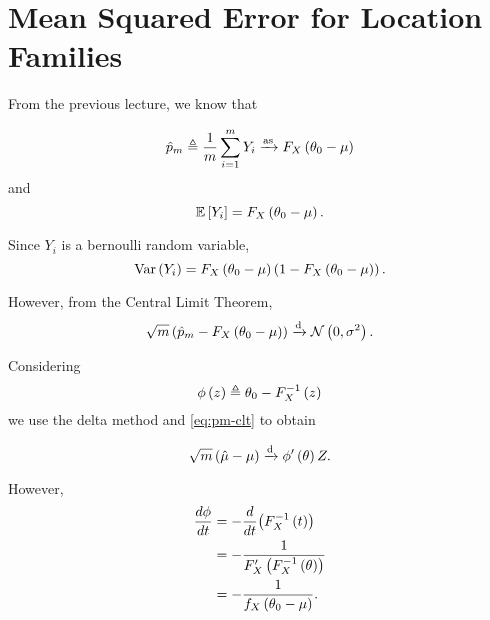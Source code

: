 \documentclass[twoside]{article}
\begin{document}



\section{Mean Squared Error for Location Families}
From the previous lecture, we know that

\begin{equation}
    \hat{p}_m \triangleq \frac{1}{m}\sum_{i=1}^mY_i \xrightarrow{\mathrm{as}} F_X\left(\theta_0-\mu\right)
    \label{eq:pm-as-conv}
\end{equation}
and
\begin{equation}
    \mathbb{E}\left[ Y_i \right] = F_X\left(\theta_0-\mu\right).
    \label{eq:mean-Yi}
\end{equation}

Since \(Y_i\) is a bernoulli random variable,
\begin{equation}
    \mathrm{Var}\left(Y_i\right) = F_X\left(\theta_0-\mu\right)\left(1-F_X\left(\theta_0-\mu\right)\right).
    \label{eq:var-Yi}
\end{equation}

However, from the Central Limit Theorem,
\begin{equation}
    \sqrt{m}\left(\hat{p}_m - F_X\left(\theta_0-\mu\right)\right) \xrightarrow{\mathrm{d}} \mathcal N\left(0,\sigma^2\right).
    \label{eq:pm-clt}
\end{equation}

Considering
\begin{equation}
    \phi\left(z\right) \triangleq \theta_0 - F_X^{-1}\left(z\right)
    \label{eq:phi-def}
\end{equation}
we use the delta method and \eqref{eq:pm-clt} to obtain

\begin{equation}
    \sqrt{m}\left(\hat{\mu}-\mu\right) \xrightarrow{\mathrm{d}} \phi^\prime\left(\theta\right)Z.
    \label{eq:phi-prime-solve}
\end{equation}

However,
\begin{align}
    \frac{d\phi}{dt} &= -\frac{d}{d t}{\left(F_X^{-1}\left(t\right)\right)} \\
                     &= -\frac{1}{F_X^\prime\left(F_X^{-1}\left(\theta\right)\right)} \\
                     &= -\frac{1}{f_X\left(\theta_0-\mu\right)}.
                     \label{eq:phi-drv}
\end{align}
\end{document}
